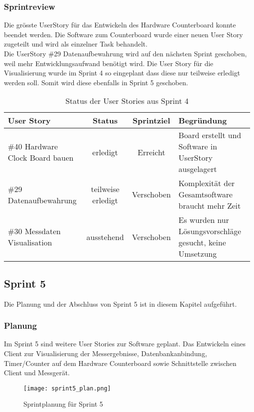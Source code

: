\subsubsection*{Sprintreview}
Die grösste UserStory für das Entwickeln des Hardware Counterboard konnte beendet werden. Die Software zum Counterboard wurde einer neuen User Story zugeteilt und wird als einzelner Task behandelt.\\
Die UserStory \#29 Datenaufbewahrung wird auf den nächsten Sprint geschoben, weil mehr Entwicklungsaufwand benötigt wird. Die User Story für die Visualisierung wurde im Sprint 4 so eingeplant dass diese nur teilweise erledigt werden soll. Somit wird diese ebenfalls in Sprint 5 geschoben.
\begin{table}[H]
    \centering
    \begin{tabular}{p{4cm}ccp{7cm}}
        \textbf{User Story} &  \textbf{Status} & \textbf{Sprintziel}& \textbf{Begründung}\\\toprule[2pt]
        \#40 Hardware Clock Board bauen & erledigt & Erreicht & Board erstellt und Software in UserStory ausgelagert\\
        \#29 Datenaufbewahrung & teilweise erledigt & Verschoben & Komplexität der Gesamtsoftware braucht mehr Zeit\\
        \#30 Messdaten Visualisation & ausstehend & Verschoben & Es wurden nur Lösungsvorschläge gesucht, keine Umsetzung\\
    \end{tabular}
    \caption{Status der User Stories aus Sprint 4}
\end{table}

\clearpage
\subsection*{Sprint 5}
Die Planung und der Abschluss von Sprint 5 ist in diesem Kapitel aufgeführt.
\subsubsection*{Planung}
Im Sprint 5 sind weitere User Stories zur Software geplant. Das Entwickeln eines Client zur Visualisierung der Messergebnisse, Datenbankanbindung, Timer/Counter auf dem Hardware Counterboard sowie Schnittstelle zwischen Client und Messgerät.
\begin{figure}[H]
    \centering
    \texttt{[image: sprint5\_plan.png]}
    \caption{Sprintplanung für Sprint 5}
\end{figure}
